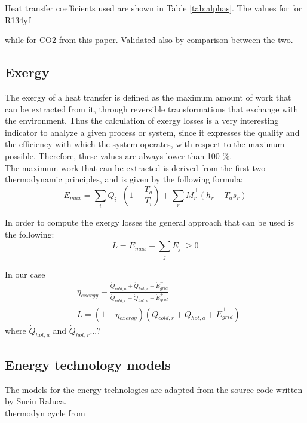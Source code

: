 \documentclass{article}
\begin{document}
Heat transfer coefficients used are shown in Table \ref{tab:alphas}.
The values for for R134yf \cite{wangOverviewHeatTransfer2013}

while for CO2 from this paper\cite{ohFlowBoilingHeat2011}.
Validated also by comparison between the two\cite{mastrulloComparisonR744R134a2009}. 
\\




\subsection{Exergy}
The exergy of a heat transfer is defined as the maximum amount of work that can be extracted from it, through reversible transformations that exchange with the environment. Thus the calculation of exergy losses is a very interesting indicator to analyze a given process or system, since it expresses the quality and the efficiency with which the system operates, with respect to the maximum possible. Therefore, these values are always lower than 100 \%. \\

The maximum work that can be extracted is derived from the first two thermodynamic principles, and is given by the following formula:
\begin{equation}
    \dot{E}^{-}_{max} = \sum_{i} \dot{Q_i}^{+} (1 - \frac{T_{a}}{T_i} ) + \sum_{r} \dot{M}_{r}^{+} (h_{r} - T_{a} s_{r})    
\end{equation}

In order to compute the exergy losses the general approach that can be used is the following:
\begin{equation}
    \dot{L} = \dot{E}^{-}_{max} - \sum_{j}\dot{E}^{-}_{j} \geq 0
\end{equation}

In our case
\begin{align}
    & \eta_{exergy} =  \frac{\dot{Q}_{cold,a} + \dot{Q}_{hot,r} + \dot{E}_{grid}^{-}}{\dot{Q}_{cold,r} + \dot{Q}_{hot,a} + \dot{E}_{grid}^{+}}  \\
    & \dot{L} = (1-\eta_{exergy})(\dot{Q}_{cold,r} + \dot{Q}_{hot,a} + \dot{E}_{grid}^{+})
\end{align}
where $\dot{Q}_{hot,a}$ and $\dot{Q}_{hot,r}$...?

\subsection{Energy technology models}\label{ss:et}
The models for the energy technologies are adapted from the source code written by Suciu Raluca.\\
thermodyn cycle from\cite{demierreModelingExperimentalInvestigation2014}\\
\end{document}
